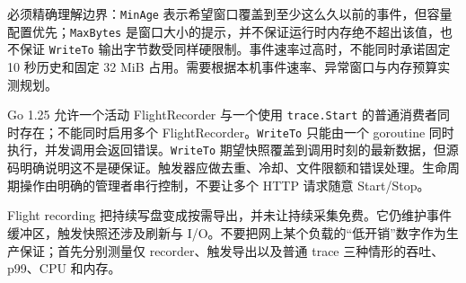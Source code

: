 \documentclass[UTF8,fontset=fandol,openany,11pt]{ctexbook}
\begin{document}
必须精确理解边界：\texttt{MinAge} 表示希望窗口覆盖到至少这么久以前的事件，但容量配置优先；\texttt{MaxBytes} 是窗口大小的提示，并不保证运行时内存绝不超出该值，也不保证 \texttt{WriteTo} 输出字节数受同样硬限制。事件速率过高时，不能同时承诺固定 10 秒历史和固定 32 MiB 占用。需要根据本机事件速率、异常窗口与内存预算实测规划。\cite{tools-flight-source}

Go 1.25 允许一个活动 FlightRecorder 与一个使用 \texttt{trace.\allowbreak{}Start} 的普通消费者同时存在；不能同时启用多个 FlightRecorder。\texttt{WriteTo} 只能由一个 goroutine 同时执行，并发调用会返回错误。\texttt{WriteTo} 期望快照覆盖到调用时刻的最新数据，但源码明确说明这不是硬保证。触发器应做去重、冷却、文件限额和错误处理。生命周期操作由明确的管理者串行控制，不要让多个 HTTP 请求随意 Start/Stop。

Flight recording 把持续写盘变成按需导出，并未让持续采集免费。它仍维护事件缓冲区，触发快照还涉及刷新与 I/O。不要把网上某个负载的“低开销”数字作为生产保证；首先分别测量仅 recorder、触发导出以及普通 trace 三种情形的吞吐、p99、CPU 和内存。
\end{document}
